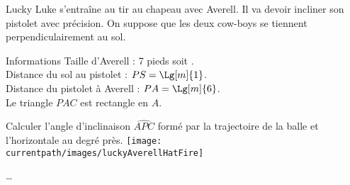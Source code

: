 \begin{exercice*}
    Lucky Luke s'entraîne au tir au chapeau avec Averell. Il va devoir incliner son pistolet avec précision.
    On suppose que les deux cow-boys se tiennent perpendiculairement au sol.
    \begin{myBox}{ Informations}
        Taille d'Averell : 7 pieds soit .\\
        Distance du sol au pistolet : $PS = \Lg[m]{1}$.\\
        Distance du pistolet à Averell : $PA = \Lg[m]{6}$.\\
        Le triangle $PAC$ est rectangle en $A$.
    \end{myBox}
    Calculer l'angle d'inclinaison $\widehat{APC}$ formé par la trajectoire de la balle et l'horizontale au degré près.
    \texttt{[image: \\currentpath/images/luckyAverellHatFire]}
\end{exercice*}
\begin{corrige}
    \dots
\end{corrige}

